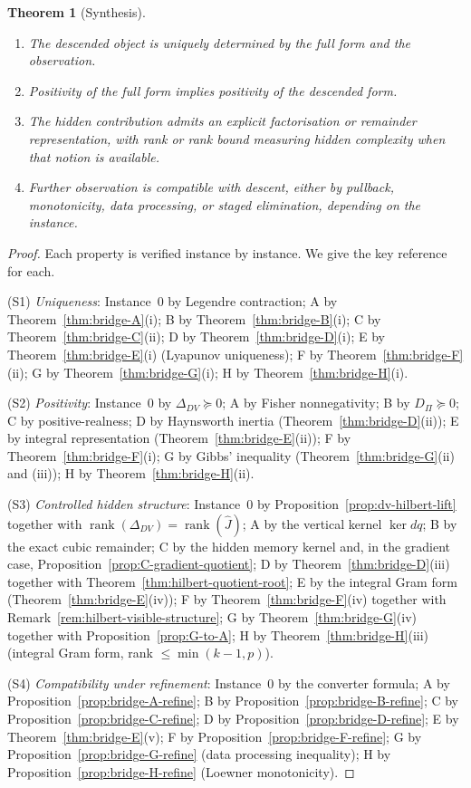 \documentclass[11pt,a4paper]{article}
\numberwithin{equation}{section}
\DeclareMathOperator{\rank}{rank}
\theoremstyle{thmcompact}
\newtheorem{theorem}{Theorem}[section]
\theoremstyle{remark}
\begin{document}
\begin{theorem}[Synthesis]
\begin{enumerate}[label=\textup{(S\arabic*)}]
\item The descended object is uniquely determined by the full form and the observation.
\item Positivity of the full form implies positivity of the descended form.
\item The hidden contribution admits an explicit factorisation or remainder representation, with rank or rank bound measuring hidden complexity when that notion is available.
\item Further observation is compatible with descent, either by pullback, monotonicity, data processing, or staged elimination, depending on the instance.
\end{enumerate}
\end{theorem}

\begin{proof}
Each property is verified instance by instance. We give the key reference for each.

(S1) \textit{Uniqueness}: Instance~0 by Legendre contraction; A by Theorem~\ref{thm:bridge-A}(i); B by Theorem~\ref{thm:bridge-B}(i); C by Theorem~\ref{thm:bridge-C}(ii); D by Theorem~\ref{thm:bridge-D}(i); E by Theorem~\ref{thm:bridge-E}(i) (Lyapunov uniqueness); F by Theorem~\ref{thm:bridge-F}(ii); G by Theorem~\ref{thm:bridge-G}(i); H by Theorem~\ref{thm:bridge-H}(i).

(S2) \textit{Positivity}: Instance~0 by $\Delta_{DV} \succeq 0$; A by Fisher nonnegativity; B by $D_\Pi \succeq 0$; C by positive-realness; D by Haynsworth inertia (Theorem~\ref{thm:bridge-D}(ii)); E by integral representation (Theorem~\ref{thm:bridge-E}(ii)); F by Theorem~\ref{thm:bridge-F}(i); G by Gibbs' inequality (Theorem~\ref{thm:bridge-G}(ii) and (iii)); H by Theorem~\ref{thm:bridge-H}(ii).

(S3) \textit{Controlled hidden structure}: Instance~0 by Proposition~\ref{prop:dv-hilbert-lift} together with $\rank(\Delta_{DV}) = \rank(\widehat{J})$; A by the vertical kernel $\ker dq$; B by the exact cubic remainder; C by the hidden memory kernel and, in the gradient case, Proposition~\ref{prop:C-gradient-quotient}; D by Theorem~\ref{thm:bridge-D}(iii) together with Theorem~\ref{thm:hilbert-quotient-root}; E by the integral Gram form (Theorem~\ref{thm:bridge-E}(iv)); F by Theorem~\ref{thm:bridge-F}(iv) together with Remark~\ref{rem:hilbert-visible-structure}; G by Theorem~\ref{thm:bridge-G}(iv) together with Proposition~\ref{prop:G-to-A}; H by Theorem~\ref{thm:bridge-H}(iii) (integral Gram form, rank $\leq \min(k{-}1, p)$).

(S4) \textit{Compatibility under refinement}: Instance~0 by the converter formula; A by Proposition~\ref{prop:bridge-A-refine}; B by Proposition~\ref{prop:bridge-B-refine}; C by Proposition~\ref{prop:bridge-C-refine}; D by Proposition~\ref{prop:bridge-D-refine}; E by Theorem~\ref{thm:bridge-E}(v); F by Proposition~\ref{prop:bridge-F-refine}; G by Proposition~\ref{prop:bridge-G-refine} (data processing inequality); H by Proposition~\ref{prop:bridge-H-refine} (Loewner monotonicity).
\end{proof}
\end{document}

